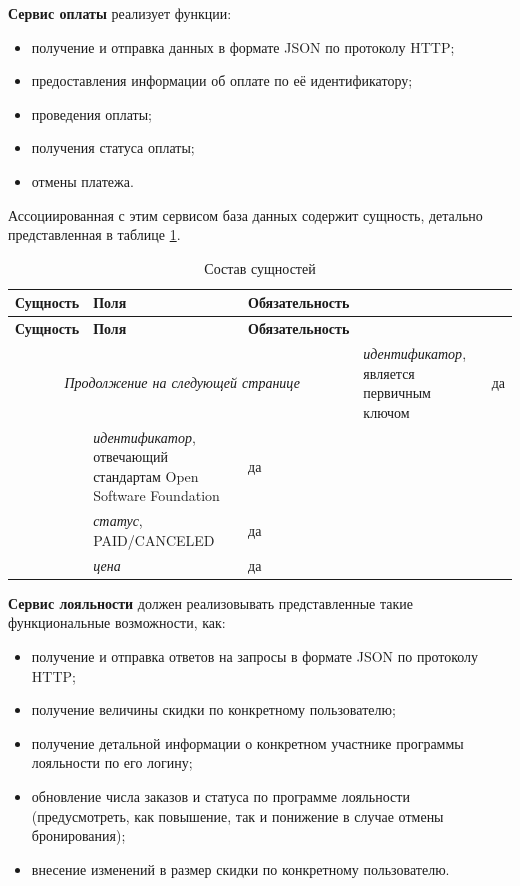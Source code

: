 \textbf{Сервис оплаты} реализует функции:
\begin{itemize}
	\item получение и отправка данных в формате JSON по протоколу HTTP;
	
	\item предоставления информации об оплате по её идентификатору;
	
	\item проведения оплаты;
	
	\item получения статуса оплаты;
	
	\item отмены платежа.
\end{itemize}

Ассоциированная с этим сервисом база данных содержит сущность, детально представленная в таблице \ref{tbl:db_payment}.
\begin{longtable}{| p{4cm} | p{8.3cm} | p{3.6cm} |}
	\caption{Состав сущностей}
	\label{tbl:db_payment} \\
	\hline
	
	\textbf{Сущность} & \textbf{Поля} & \textbf{Обязательность} \\
	\hline
	\endfirsthead
	
	\hline
	\textbf{Сущность} & \textbf{Поля} & \textbf{Обязательность} \\
	\hline
	\endhead
	
	\hline
	\multicolumn{3}{c}{\textit{Продолжение на следующей странице}}
	\endfoot
	\hline
	\endlastfoot
	
	\multirow{5}{*}{Платёж}
	& 
	\textit{идентификатор}, является первичным ключом
	& 
	да \\
	\cline{2-3}
	
	&
	\textit{идентификатор}, отвечающий стандартам Open Software Foundation
	&
	да \\
	\cline{2-3}

	& 
	\textit{статус}, PAID/CANCELED
	& 
	да \\
	\cline{2-3}
	
	&
	\textit{цена}
	&
	да \\
\end{longtable}

\textbf{Сервис лояльности} должен реализовывать представленные такие функциональные возможности, как:
\begin{itemize}
	\item получение и отправка ответов на запросы в формате JSON по протоколу HTTP;
	
	\item получение величины скидки по конкретному пользователю;
	
	\item получение детальной информации о конкретном участнике программы лояльности по его логину;
	
	\item обновление числа заказов и статуса по программе лояльности (предусмотреть, как повышение, так и понижение в случае отмены бронирования);
	
	\item внесение изменений в размер скидки по конкретному пользователю.
\end{itemize}


